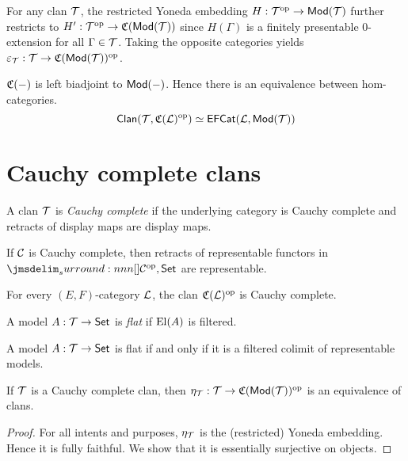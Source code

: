 \documentclass[a4paper]{article}
\begin{document}
\begin{construction}
  For any clan $\mathcal{T}$, the restricted Yoneda embedding $H : \mathcal{T}^{\mathrm{op}} \to \mathsf{Mod}(\mathcal{T})$ further restricts to $H' : \mathcal{T}^{\mathrm{op}} \to \mathfrak{C}(\mathsf{Mod}(\mathcal{T}))$ since $H(\Gamma)$ is a finitely presentable 0-extension for all $\Gamma \in \mathcal{T}$.
  Taking the opposite categories yields $\varepsilon_{\mathcal{T}} : \mathcal{T} \to \mathfrak{C}(\mathsf{Mod}(\mathcal{T}))^{\mathrm{op}}$.
\end{construction}

\begin{theorem}
  $\mathfrak{C}(-)$ is left biadjoint to $\mathsf{Mod}(-)$.
  Hence there is an equivalence between hom-categories.
  \[
    \mathsf{Clan}(\mathcal{T},\mathfrak{C}(\mathcal{L})^{\mathrm{op}}) \simeq \mathsf{EFCat}(\mathcal{L},\mathsf{Mod}(\mathcal{T}))
  \]
\end{theorem}

\section{Cauchy complete clans}

\begin{definition}
  A clan $\mathcal{T}$ is \emph{Cauchy complete} if the underlying category is Cauchy complete and retracts of display maps are display maps.
\end{definition}

\begin{remark}
  If $\mathcal{C}$ is Cauchy complete, then retracts of representable functors in $\funCat{\cC\op}{\Set}$ are representable.
\end{remark}

\begin{remark}
  For every $(E,F)$-category $\mathcal{L}$, the clan $\mathfrak{C}(\mathcal{L})^{\mathrm{op}}$ is Cauchy complete.
\end{remark}

\begin{definition}
  A model $A : \mathcal{T} \to \mathsf{Set}$ is \emph{flat} if $\operatorname{El}(A)$ is filtered.
\end{definition}

\begin{lemma}
  A model $A : \mathcal{T} \to \mathsf{Set}$ is flat if and only if it is a filtered colimit of representable models.
\end{lemma}

\begin{theorem}
  If $\mathcal{T}$ is a Cauchy complete clan, then $\eta_{\mathcal{T}} : \mathcal{T} \to \mathfrak{C}(\mathsf{Mod}(\mathcal{T}))^{\mathrm{op}}$ is an equivalence of clans.
\end{theorem}
\begin{proof}
  For all intents and purposes, $\eta_{\mathcal{T}}$ is the (restricted) Yoneda embedding.
  Hence it is fully faithful.
  We show that it is essentially surjective on objects.
  \todo
\end{proof}
\end{document}

